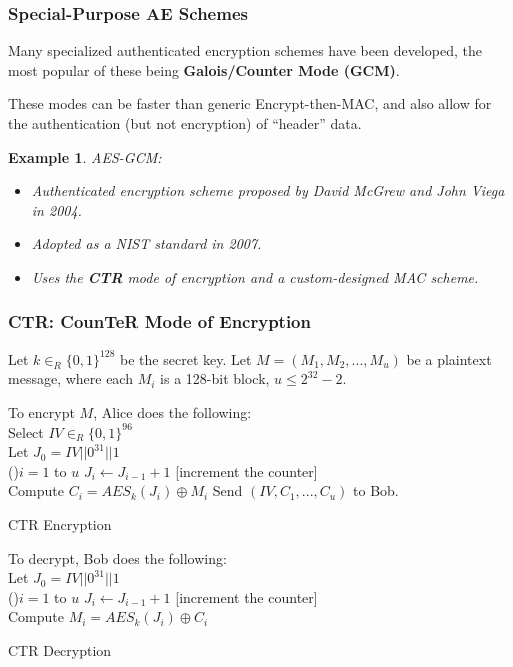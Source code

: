 \documentclass[12pt,titlepage]{article}
\newtheorem{protoexample}[prototheorem]{Example}
\newenvironment{example}
{\colorlet{shadecolor}{red!15}\begin{shaded}\begin{protoexample}\normalfont}{\end{protoexample}\end{shaded}}
\begin{document}
\subsubsection{Special-Purpose AE Schemes}

Many specialized authenticated encryption schemes have been developed, the most popular of these being \textbf{Galois/Counter Mode (GCM)}.

These modes can be faster than generic Encrypt-then-MAC, and also allow for the authentication (but not encryption) of ``header'' data.

\begin{example}
	AES-GCM: \begin{itemize}
		\item Authenticated encryption scheme proposed by David McGrew and John Viega in 2004.
		\item Adopted as a NIST standard in 2007.
		\item Uses the \textbf{CTR} mode of encryption and a custom-designed MAC scheme.
	\end{itemize}
\end{example}

\subsubsection{CTR: CounTeR Mode of Encryption}

Let $k \in_R \{0,1\}^{128}$ be the secret key. Let $M = (M_1, M_2 ,... , M_u)$ be a plaintext message, where each $M_i$ is a 128-bit block, $u \leq 2^{32} - 2$.

\begin{algorithm}
	To encrypt $M$, Alice does the following:\\
	Select $IV \in_R \{0, 1\}^{96}$\\
	Let $J_0 = IV || 0^{31} || 1$\\
	\For(){$i = 1$ to $u$}{
		$J_i \leftarrow J_{i-1} + 1$ [increment the counter]\\
		Compute $C_i = AES_k(J_i) \oplus M_i$
	}
	Send $(IV, C_1, ..., C_u)$ to Bob.
	\caption{CTR Encryption}
\end{algorithm}

\begin{algorithm}
	To decrypt, Bob does the following:\\
	Let $J_0 = IV || 0^{31} || 1$\\
	\For(){$i = 1$ to $u$}{
		$J_i \leftarrow J_{i-1} + 1$ [increment the counter]\\
		Compute $M_i = AES_k(J_i) \oplus C_i$
	}
	\caption{CTR Decryption}
\end{algorithm}
\end{document}
